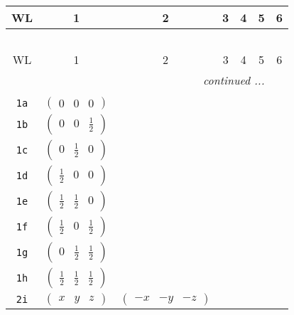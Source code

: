 \documentclass[fleqn,9pt,landscape]{jsarticle}
\begin{document}
\begin{center}
\renewcommand{\arraystretch}{1.2}
\begin{longtable}{ccccccc}
 \hline \hline
WL & 1 & 2 & 3 & 4 & 5 & 6 \\ \hline \endfirsthead

\multicolumn{6}{l}{\tablename\ \thetable{}} \\
 \hline \hline
WL & 1 & 2 & 3 & 4 & 5 & 6 \\ \hline \endhead

 \hline \hline
\multicolumn{6}{r}{\footnotesize\it continued ...} \\ \endfoot

 \hline \hline
\multicolumn{6}{r}{} \\ \endlastfoot

{\tt 1a} & $ \begin{pmatrix} 0 & 0 & 0 \end{pmatrix} $ & $  $ \\ \hline
{\tt 1b} & $ \begin{pmatrix} 0 & 0 & \frac{1}{2} \end{pmatrix} $ & $  $ \\ \hline
{\tt 1c} & $ \begin{pmatrix} 0 & \frac{1}{2} & 0 \end{pmatrix} $ & $  $ \\ \hline
{\tt 1d} & $ \begin{pmatrix} \frac{1}{2} & 0 & 0 \end{pmatrix} $ & $  $ \\ \hline
{\tt 1e} & $ \begin{pmatrix} \frac{1}{2} & \frac{1}{2} & 0 \end{pmatrix} $ & $  $ \\ \hline
{\tt 1f} & $ \begin{pmatrix} \frac{1}{2} & 0 & \frac{1}{2} \end{pmatrix} $ & $  $ \\ \hline
{\tt 1g} & $ \begin{pmatrix} 0 & \frac{1}{2} & \frac{1}{2} \end{pmatrix} $ & $  $ \\ \hline
{\tt 1h} & $ \begin{pmatrix} \frac{1}{2} & \frac{1}{2} & \frac{1}{2} \end{pmatrix} $ & $  $ \\ \hline
{\tt 2i} & $ \begin{pmatrix} x & y & z \end{pmatrix} $ & $ \begin{pmatrix} - x & - y & - z \end{pmatrix} $ \\
\end{longtable}
\end{center}
\end{document}
